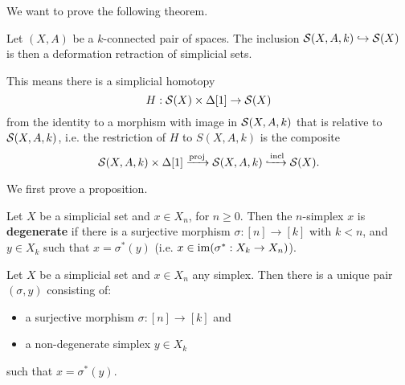 We want to prove the following theorem.

\begin{theorem**}
Let $(X,A)$ be a $k$-connected pair of spaces. The inclusion $\S(X,A,k)\hto\S(X)$ is then a deformation retraction of simplicial sets.
\end{theorem**}

This means there is a simplicial homotopy
\[H:\S(X)\times\Delta[1]\to \S(X)\]
from the identity to a morphism with image in $\S(X,A,k)$ that is relative to $\S(X,A,k)$, i.e. the restriction of $H$ to $S(X,A,k)$ is the composite
\[\S(X,A,k)\times\Delta[1]\xto{\text{proj}}\S(X,A,k)\xhto{\text{incl}}\S(X).\]

We first prove a proposition.

Let $X$ be a simplicial set and $x\in X_n$, for $n\geq0$. Then the $n$-simplex $x$ is \textbf{degenerate} if there is a surjective morphism $\sigma:[n]\to [k]$ with $k<n$, and $y\in X_k$ such that $x=\sigma^*(y)$ (i.e. $x\in\im(\sigma^*:X_k\to X_n)$).

\begin{proposition}\label{proposition:non-degenerate-simplices}
Let $X$ be a simplicial set and $x\in X_n$ any simplex. Then there is a unique pair $(\sigma,y)$ consisting of:
\begin{itemize}[label={-}]
    \item a surjective morphism $\sigma: [n]\to [k]$ and
    \item a non-degenerate simplex $y\in X_k$
\end{itemize}
such that $x=\sigma^*(y)$.
\end{proposition}

